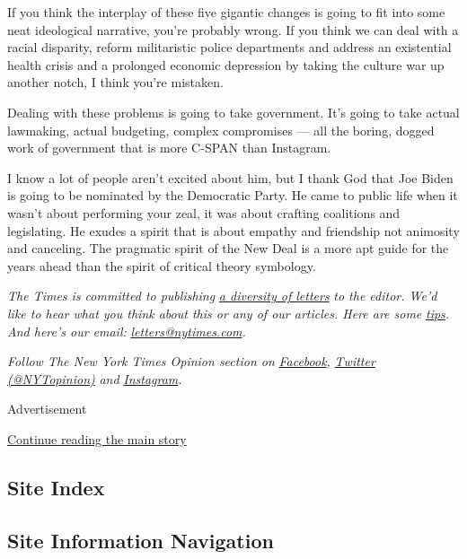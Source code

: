 If you think the interplay of these five gigantic changes is going to
fit into some neat ideological narrative, you're probably wrong. If you
think we can deal with a racial disparity, reform militaristic police
departments and address an existential health crisis and a prolonged
economic depression by taking the culture war up another notch, I think
you're mistaken.

Dealing with these problems is going to take government. It's going to
take actual lawmaking, actual budgeting, complex compromises --- all the
boring, dogged work of government that is more C-SPAN than Instagram.

I know a lot of people aren't excited about him, but I thank God that
Joe Biden is going to be nominated by the Democratic Party. He came to
public life when it wasn't about performing your zeal, it was about
crafting coalitions and legislating. He exudes a spirit that is about
empathy and friendship not animosity and canceling. The pragmatic spirit
of the New Deal is a more apt guide for the years ahead than the spirit
of critical theory symbology.

\emph{The Times is committed to publishing}
\href{https://www.nytimes.com/2019/01/31/opinion/letters/letters-to-editor-new-york-times-women.html}{\emph{a
diversity of letters}} \emph{to the editor. We'd like to hear what you
think about this or any of our articles. Here are some}
\href{https://help.nytimes.com/hc/en-us/articles/115014925288-How-to-submit-a-letter-to-the-editor}{\emph{tips}}\emph{.
And here's our email:}
\href{mailto:letters@nytimes.com}{\emph{letters@nytimes.com}}\emph{.}

\emph{Follow The New York Times Opinion section on}
\href{https://www.facebook.com/nytopinion}{\emph{Facebook}}\emph{,}
\href{http://twitter.com/NYTOpinion}{\emph{Twitter (@NYTopinion)}}
\emph{and}
\href{https://www.instagram.com/nytopinion/}{\emph{Instagram}}\emph{.}

Advertisement

\protect\hyperlink{after-bottom}{Continue reading the main story}

\hypertarget{site-index}{%
\subsection{Site Index}\label{site-index}}

\hypertarget{site-information-navigation}{%
\subsection{Site Information
Navigation}\label{site-information-navigation}}

